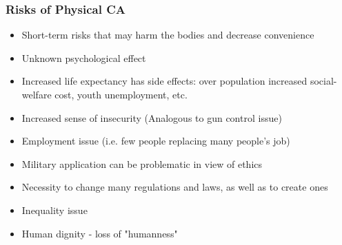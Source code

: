 \subsubsection{Risks of Physical CA}

\begin{itemize}
	\item Short-term risks that may harm the bodies and decrease convenience
	\item Unknown psychological effect
	\item Increased life expectancy has side effects: over population increased social-welfare cost, youth unemployment, etc.
	\item Increased sense of insecurity (Analogous to gun control issue)
	\item Employment issue (i.e. few people replacing many people's job)
	\item Military application can be problematic in view of ethics
	\item Necessity to change many regulations and laws, as well as to create ones
	\item Inequality issue
	\item Human dignity - loss of "humanness"
	
\end{itemize}